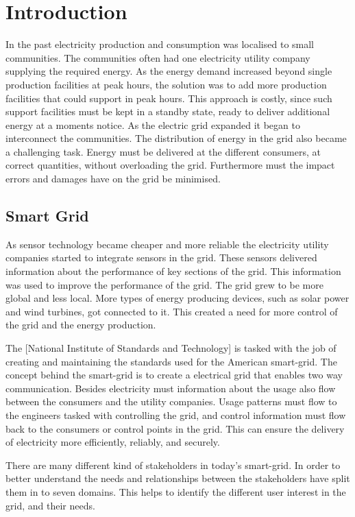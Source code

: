 \chapter{Introduction}

In the past electricity production and consumption was localised to small communities. The communities often had one electricity utility company supplying the required energy. As the energy demand increased beyond single production facilities at peak hours, the solution was to add more production facilities that could support in peak hours. This approach is costly, since such support facilities must be kept in a standby state, ready to deliver additional energy at a moments notice. As the electric grid expanded it began to interconnect the communities. The distribution of energy in the grid also became a challenging task. Energy must be delivered at the different consumers, at correct quantities, without overloading the grid. Furthermore must the impact errors and damages have on the grid be minimised. 

\section{Smart Grid}
As sensor technology became cheaper and more reliable the electricity utility companies started to integrate sensors in the grid. These sensors delivered information about the performance of key sections of the grid. This information was used to improve the performance of the grid. The grid grew to be more global and less local. More types of energy producing devices, such as solar power and wind turbines, got connected to it. This created a need for more control of the grid and the energy production. 

The [National Institute of Standards and Technology] is tasked with the job of creating and maintaining the standards used for the American smart-grid. The concept behind the smart-grid is to create a electrical grid that enables two way communication. Besides electricity must information about the usage also flow between the consumers and the utility companies. Usage patterns must flow to the engineers tasked with controlling the grid, and control information must flow back to the consumers or control points in the grid. This can ensure the delivery of electricity more efficiently, reliably, and securely. 

There are many different kind of stakeholders in today's smart-grid. In order to better understand the needs and relationships between the stakeholders have  split them in to seven domains. This helps to identify the different user interest in the grid, and their needs.  

